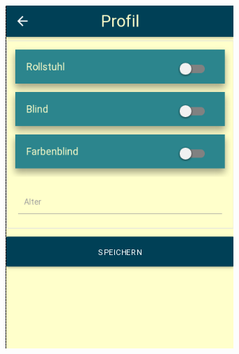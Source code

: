 \begin{figure}[ht]
\begin{minipage}[b]{.5\textwidth}
  \includegraphics[width=.8\linewidth]{img/profil.png}
  \label{img:profil-first-draft}
\end{minipage}
\end{figure}

